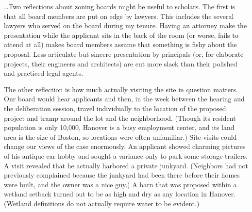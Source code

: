 

\ldots Two reflections about zoning boards might be useful to scholars. The
first is that all board members are put on edge by lawyers. This includes the
several lawyers who served on the board during my tenure. Having an attorney
make the presentation while the applicant sits in the back of the room (or
worse, fails to attend at all) makes board members assume that something is
fishy about the proposal. Less articulate but sincere presentation by principals
(or, for elaborate projects, their engineers and architects) are cut more slack
than their polished and practiced legal agents.

The other reflection is how much actually visiting the site in question matters.
Our board would hear applicants and then, in the week between the hearing and
the deliberation session, travel individually to the location of the proposed
project and tramp around the lot and the neighborhood. (Though its resident
population is only 10,000, Hanover is a busy employment center, and its land
area is the size of Boston, so locations were often unfamiliar.) Site visits
could change our views of the case enormously. An applicant showed charming
pictures of his antique-car hobby and sought a variance only to park some
storage trailers. A visit revealed that he actually harbored a private junkyard.
(Neighbors had not previously complained because the junkyard had been there
before their homes were built, and the owner was a nice guy.) A barn that was
proposed within a wetland setback turned out to be as high and dry as any
location in Hanover. (Wetland definitions do not actually require water to be
evident.)

